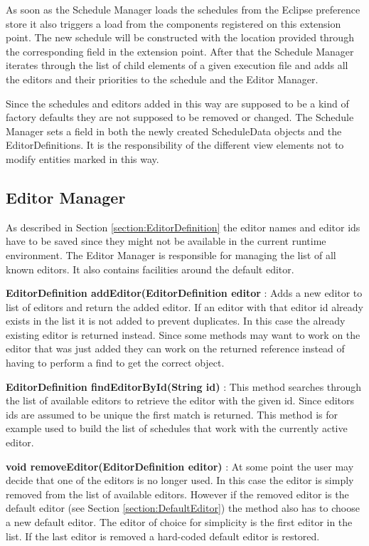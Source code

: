 As soon as the Schedule Manager loads the schedules from the Eclipse preference store it also triggers
a load from the components registered on this extension point. The new schedule will be constructed with
the location provided through the corresponding field in the extension point. After that the Schedule Manager
iterates through the list of child elements of a given execution file and adds all the editors and their
priorities to the schedule and the Editor Manager.

Since the schedules and editors added in this way are supposed to be a kind of factory defaults they are not
supposed to be removed or changed. The Schedule Manager sets a field in both the newly created ScheduleData
objects and the EditorDefinitions. It is the responsibility of the different view elements not to modify
entities marked in this way.


\subsection{Editor Manager}
\label{section:EditorManager}
As described in Section \ref{section:EditorDefinition} the editor names and editor ids have to be saved
since they might not be available in the current runtime environment. The Editor Manager is responsible
for managing the list of all known editors. It also contains facilities around the default editor.

\begin{description}
 \item \textbf{EditorDefinition addEditor(EditorDefinition editor} : Adds a new editor to list of 
editors and return the added editor. If an editor with that editor id already exists in the list it is
not added to prevent duplicates. In this case the already existing editor is returned instead. Since
some methods may want to work on the editor that was just added they can work on the returned reference
instead of having to perform a find to get the correct object.
 \item \textbf{EditorDefinition findEditorById(String id)} : This method searches through the list
of available editors to retrieve the editor with the given id. Since editors ids are assumed to be
unique the first match is returned. This method is for example used to build the list of schedules that
work with the currently active editor.
 \item \textbf{void removeEditor(EditorDefinition editor)} : At some point the user may decide that
one of the editors is no longer used. In this case the editor is simply removed from the list of
available editors. However if the removed editor is the default editor (see Section \ref{section:DefaultEditor})
the method also has to choose a new default editor. The editor of choice for simplicity is the first
editor in the list. If the last editor is removed a hard-coded default editor is restored.
\end{description}

